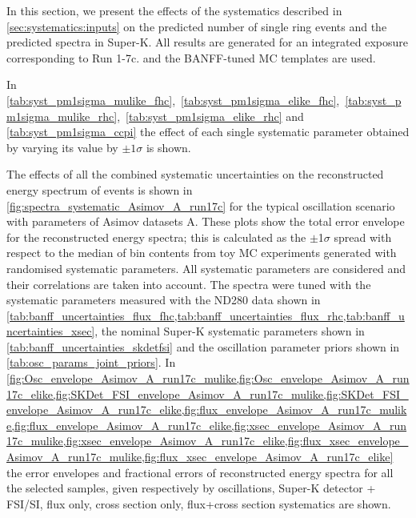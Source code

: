 In this section, we present the effects of the systematics described in \cref{sec:systematics:inputs}
on the predicted number of single ring events and the predicted spectra in Super-K.
All results are generated for an integrated exposure 
corresponding to Run 1-7c.
and
the BANFF-tuned MC templates are used.



In \cref{tab:syst_pm1sigma_mulike_fhc},~\cref{tab:syst_pm1sigma_elike_fhc},~\cref{tab:syst_pm1sigma_mulike_rhc},~\cref{tab:syst_pm1sigma_elike_rhc} and \cref{tab:syst_pm1sigma_ccpi}
the effect of each single systematic parameter
obtained by varying its value by $\pm 1 \sigma$ is shown.






%

\clearpage


\clearpage

The effects of all the combined systematic uncertainties on the reconstructed energy spectrum of events
is shown in \cref{fig:spectra_systematic_Asimov_A_run17c} 
for the typical oscillation scenario with parameters of Asimov datasets A.
These plots show the total error envelope for the reconstructed energy spectra; 
this is calculated
as the $\pm$1$\sigma$ spread with respect to the median of bin contents from \NumToys toy MC experiments generated with 
randomised systematic parameters.
All systematic parameters are considered and their correlations are taken into account.
The spectra were tuned with the systematic parameters measured with the ND280 data 
shown in \cref{tab:banff_uncertainties_flux_fhc,tab:banff_uncertainties_flux_rhc,tab:banff_uncertainties_xsec},
the nominal Super-K systematic parameters shown in \cref{tab:banff_uncertainties_skdetfsi}
and the oscillation parameter priors shown in \cref{tab:osc_params_joint_priors}.
In \cref{fig:Osc_envelope_Asimov_A_run17c_mulike,fig:Osc_envelope_Asimov_A_run17c_elike,fig:SKDet_FSI_envelope_Asimov_A_run17c_mulike,fig:SKDet_FSI_envelope_Asimov_A_run17c_elike,fig:flux_envelope_Asimov_A_run17c_mulike,fig:flux_envelope_Asimov_A_run17c_elike,fig:xsec_envelope_Asimov_A_run17c_mulike,fig:xsec_envelope_Asimov_A_run17c_elike,fig:flux_xsec_envelope_Asimov_A_run17c_mulike,fig:flux_xsec_envelope_Asimov_A_run17c_elike} 
the error envelopes and fractional errors of reconstructed energy spectra for all the selected samples,
given respectively by
oscillations, Super-K detector + FSI/SI, flux only, cross section only, flux+cross section systematics
are shown. 

